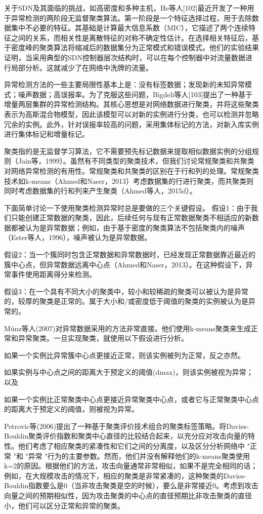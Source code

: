 关于SDN及其面临的挑战，如高密度和多种主机，He等人[102]最近开发了一种用于异常检测的两阶段无监督聚类算法。第一阶段是一个特征选择过程，用于去除数据集中不必要的特征。其基础是计算最大信息系数（MIC），它描述了两个连续特征之间的关系，而相关性是离散特征的对称不确定性估计。在选择相关特征后，基于密度峰的聚类算法将缩减后的数据集分为正常模式和错误模式。他们的实验结果证明，当采用典型的SDN控制器层次结构时，可以在每个控制器中对流量数据进行局部分析。这就减少了在网络中洗牌的流量。

异常检测方法的一些主要局限性基本上是：没有标签数据；发现新的未知异常模式；噪声数据；高误报率。为了克服这些问题，Bigdeli等人[103]提出了一种基于增量两层集群的异常检测结构。其核心思想是对网络数据进行聚类，并将这些聚类表示为高斯混合物模型，因此该模型可以对新的实例进行分类，也可以检测并忽略冗余的实例。此外，针对误报率较高的问题，采用集体标记的方法，对新入库实例进行集体标记和增量标记。


聚类指的是无监督学习算法，它不需要预先标记数据来提取相似数据实例的分组规则（Jain等，1999）。虽然有不同类型的聚类技术，但我们讨论常规聚类和共聚类对网络异常检测的有用性。常规聚类和共聚类的区别在于行和列的处理。常规聚类技术如k-means（Ahmed和Naser，2013）考虑数据集的行进行聚类，而共聚类则同时考虑数据集的行和列来产生聚类（Ahmed等人，2015d）。

下面简单讨论一下使用聚类检测异常时总是要做的三个关键假设。
假设1：由于我们只能创建正常数据的聚类，因此，后续任何与现有正常数据聚类不相适应的新数据都被认为是异常数据；例如，由于基于密度的聚类算法不包括聚类内的噪声（Ester等人，1996），噪声被认为是异常数据。

假设2：当一个簇同时包含正常数据和异常数据时，已经发现正常数据靠近最近的簇中心点，但异常数据远离中心点（Ahmed和Naser，2013）。在这种假设下，异常事件使用距离得分来检测。

假设3：在一个具有不同大小的聚类中，较小和较稀疏的聚类可以被认为是异常的，较厚的聚类是正常的。属于大小和/或密度低于阈值的聚类的实例被认为是异常的。


Münz等人(2007)对异常数据采用的方法非常直接。他们使用k-means聚类来生成正常和异常聚类。一旦实现聚类，就使用以下假设进行分析。

如果一个实例比异常簇中心点更接近正常，则该实例被列为正常，反之亦然。


如果实例与中心点之间的距离大于预定义的阈值(dmax)，则该实例被视为异常；以及


如果一个实例比正常聚类中心点更接近异常聚类中心点，或者它与正常聚类中心点的距离大于预定义的阈值，则被视为异常。


Petrovic等(2006)提出了一种基于聚类评价技术组合的聚类标签策略。将Davies-Bouldin聚类评价指数和聚类中心直径的比较结合起来，以充分应对攻击向量的特性。他们考虑了相应聚类的紧凑性和它们之间的分离度，以及区分分析网络中 "正常 "和 "异常 "行为的主要参数。然而，他们并没有解释他们的k-means聚类使用k=2的原因。根据他们的方法，攻击向量通常非常相似，如果不是完全相同的话；例如，在大规模攻击的情况下，相应的聚类是非常紧凑的，这种聚类的Davies-Bouldin指数要么是0（当非攻击聚类是空的时候），要么是非常接近0。考虑到攻击向量之间的预期相似性，因为攻击聚类的中心点的直径预期比非攻击聚类的直径小，他们可以区分正常和异常的聚类。

